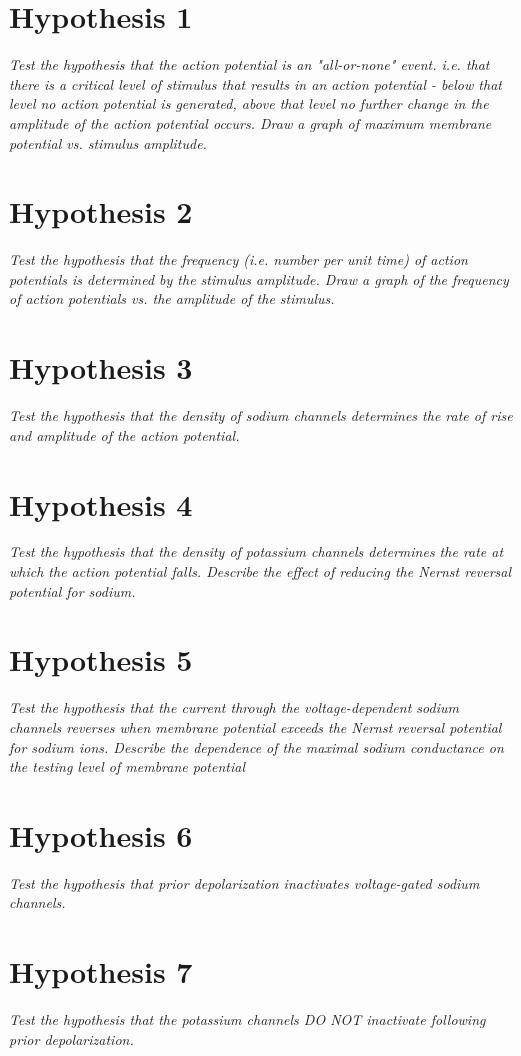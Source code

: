 \documentclass[12pt]{article}
\begin{document}
\maketitle

\section{Hypothesis 1}

\emph{Test the hypothesis that the action potential is an "all-or-none" event. i.e. that there is a critical level of stimulus that results in an action potential - below that level no action potential is generated, above that level no further change in the amplitude of the action potential occurs. Draw a graph of maximum membrane potential vs. stimulus amplitude.}

\section{Hypothesis 2}

\emph{Test the hypothesis that the frequency (i.e. number per unit time) of action potentials is determined by the stimulus amplitude.  Draw a graph of the frequency of action potentials vs. the amplitude of the stimulus.}

\section{Hypothesis 3}

\emph{Test the hypothesis that the density of sodium channels determines the rate of rise and amplitude of the action potential.}

\section{Hypothesis 4}

\emph{Test the hypothesis that the density of potassium channels determines the rate at which the action potential falls.  Describe the effect of reducing the Nernst reversal potential for sodium.}

\section{Hypothesis 5}

\emph{Test the hypothesis that the current through the voltage-dependent sodium channels reverses when membrane potential exceeds the Nernst reversal potential for sodium ions.  Describe the dependence of the maximal sodium conductance on the testing level of membrane potential}

\section{Hypothesis 6}

\emph{Test the hypothesis that prior depolarization inactivates voltage-gated sodium channels.}

\section{Hypothesis 7}

\emph{Test the hypothesis that the potassium channels DO NOT inactivate following prior depolarization.}
\end{document}
